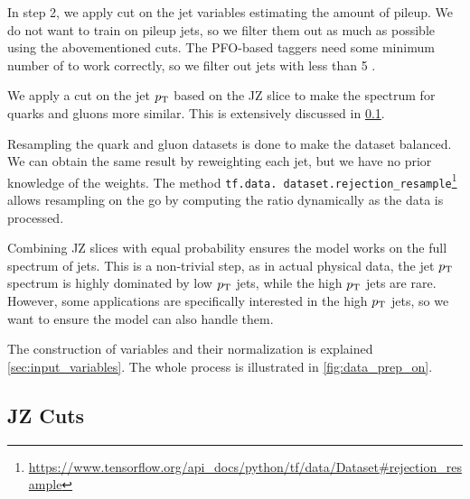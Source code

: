 In step 2, we apply cut on the jet variables estimating the amount of pileup.
We do not want to train on pileup jets, so we filter them out as much as possible using the abovementioned cuts.
The PFO-based taggers need some minimum number of \PFOs to work correctly, so we filter out jets with less than 5 \PFOs.

We apply a cut on the jet $p_\text{T}$ based on the JZ slice to make the spectrum for quarks and gluons more similar.
This is extensively discussed in \cref{sec:jet_pt_cuts}.

Resampling the quark and gluon datasets is done to make the dataset balanced.
We can obtain the same result by reweighting each jet, but we have no prior knowledge of the weights.
The method \texttt{tf.data. dataset.rejection\_resample}\footnote{\url{https://www.tensorflow.org/api_docs/python/tf/data/Dataset\#rejection\_resample}} allows resampling on the go by computing the ratio dynamically as the data is processed.

Combining JZ slices with equal probability ensures the model works on the full spectrum of jets. 
This is a non-trivial step, as in actual physical data, the jet $p_\text{T}$ spectrum is highly dominated by low $p_\text{T}$ jets, while the high $p_\text{T}$ jets are rare. 
However, some applications are specifically interested in the high $p_\text{T}$ jets, so we want to ensure the model can also handle them.

The construction of variables and their normalization is explained \cref{sec:input_variables}.
The whole process is illustrated in \cref{fig:data_prep_on}.


\subsection{JZ Cuts}
\label{sec:jet_pt_cuts}

